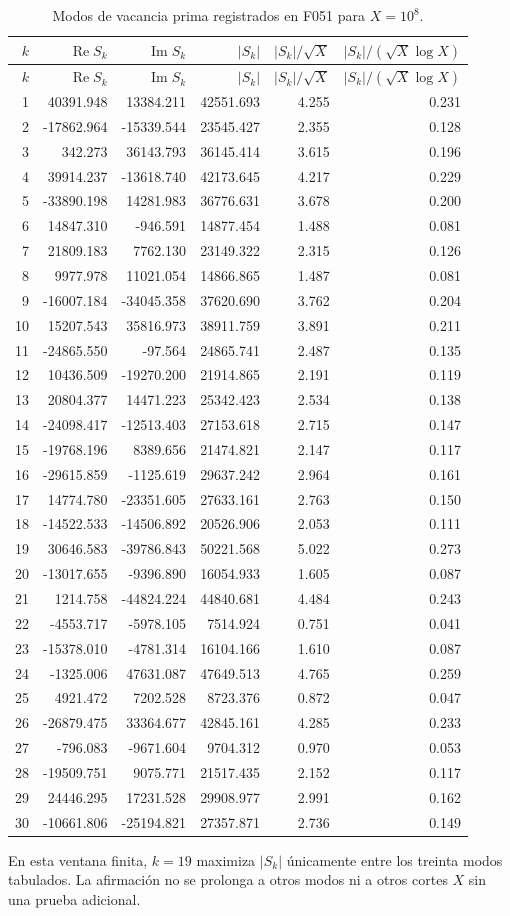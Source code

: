 \begingroup
\scriptsize
\setlength{\tabcolsep}{3.1pt}
\renewcommand{\arraystretch}{1.08}
\begin{longtable}{@{}r r r r r r@{}}
\caption{Modos de vacancia prima registrados en F051 para \(X=10^8\).}
\label{v:f051:tab:all-modes}\\
\toprule
\(k\)&\(\operatorname{Re}S_k\)&\(\operatorname{Im}S_k\)&\(|S_k|\)&\(|S_k|/\sqrt X\)&\(|S_k|/(\sqrt X\log X)\)\\
\midrule
\endfirsthead
\toprule
\(k\)&\(\operatorname{Re}S_k\)&\(\operatorname{Im}S_k\)&\(|S_k|\)&\(|S_k|/\sqrt X\)&\(|S_k|/(\sqrt X\log X)\)\\
\midrule
\endhead
1&40391.948&13384.211&42551.693&4.255&0.231\\
2&-17862.964&-15339.544&23545.427&2.355&0.128\\
3&342.273&36143.793&36145.414&3.615&0.196\\
4&39914.237&-13618.740&42173.645&4.217&0.229\\
5&-33890.198&14281.983&36776.631&3.678&0.200\\
6&14847.310&-946.591&14877.454&1.488&0.081\\
7&21809.183&7762.130&23149.322&2.315&0.126\\
8&9977.978&11021.054&14866.865&1.487&0.081\\
9&-16007.184&-34045.358&37620.690&3.762&0.204\\
10&15207.543&35816.973&38911.759&3.891&0.211\\
11&-24865.550&-97.564&24865.741&2.487&0.135\\
12&10436.509&-19270.200&21914.865&2.191&0.119\\
13&20804.377&14471.223&25342.423&2.534&0.138\\
14&-24098.417&-12513.403&27153.618&2.715&0.147\\
15&-19768.196&8389.656&21474.821&2.147&0.117\\
16&-29615.859&-1125.619&29637.242&2.964&0.161\\
17&14774.780&-23351.605&27633.161&2.763&0.150\\
18&-14522.533&-14506.892&20526.906&2.053&0.111\\
19&30646.583&-39786.843&50221.568&5.022&0.273\\
20&-13017.655&-9396.890&16054.933&1.605&0.087\\
21&1214.758&-44824.224&44840.681&4.484&0.243\\
22&-4553.717&-5978.105&7514.924&0.751&0.041\\
23&-15378.010&-4781.314&16104.166&1.610&0.087\\
24&-1325.006&47631.087&47649.513&4.765&0.259\\
25&4921.472&7202.528&8723.376&0.872&0.047\\
26&-26879.475&33364.677&42845.161&4.285&0.233\\
27&-796.083&-9671.604&9704.312&0.970&0.053\\
28&-19509.751&9075.771&21517.435&2.152&0.117\\
29&24446.295&17231.528&29908.977&2.991&0.162\\
30&-10661.806&-25194.821&27357.871&2.736&0.149\\
\bottomrule
\end{longtable}
\endgroup

En esta ventana finita, \(k=19\) maximiza \(|S_k|\) únicamente entre los
treinta modos tabulados. La afirmación no se prolonga a otros modos ni a otros
cortes \(X\) sin una prueba adicional.
